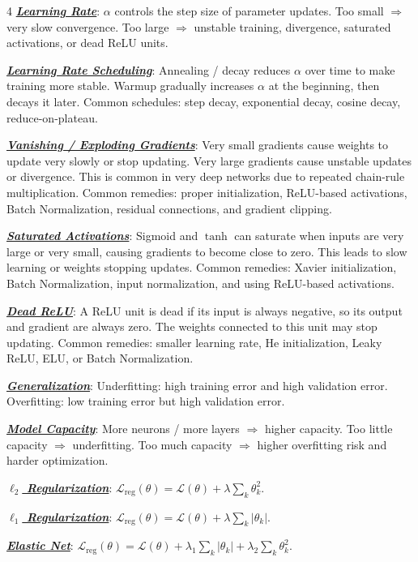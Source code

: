 \documentclass[12pt]{article}
\newcommand{\bulletPoint}[1]{\underline{\textit{\textbf{#1}}}}
\begin{document}
\begin{multicols*}{4}
\bulletPoint{Learning Rate}:
$\alpha$ controls the step size of parameter updates.
Too small $\Rightarrow$ very slow convergence.
Too large $\Rightarrow$ unstable training, divergence, saturated activations, or dead ReLU units.

\bulletPoint{Learning Rate Scheduling}:
Annealing / decay reduces $\alpha$ over time to make training more stable.
Warmup gradually increases $\alpha$ at the beginning, then decays it later.
Common schedules: step decay, exponential decay, cosine decay, reduce-on-plateau.

\bulletPoint{Vanishing / Exploding Gradients}:
Very small gradients cause weights to update very slowly or stop updating.
Very large gradients cause unstable updates or divergence.
This is common in very deep networks due to repeated chain-rule multiplication.
Common remedies: proper initialization, ReLU-based activations, Batch Normalization, residual connections, and gradient clipping.

\bulletPoint{Saturated Activations}:
Sigmoid and $\tanh$ can saturate when inputs are very large or very small, causing gradients to become close to zero.
This leads to slow learning or weights stopping updates.
Common remedies: Xavier initialization, Batch Normalization, input normalization, and using ReLU-based activations.

\bulletPoint{Dead ReLU}:
A ReLU unit is dead if its input is always negative, so its output and gradient are always zero.
The weights connected to this unit may stop updating.
Common remedies: smaller learning rate, He initialization, Leaky ReLU, ELU, or Batch Normalization.

\bulletPoint{Generalization}:
Underfitting: high training error and high validation error.
Overfitting: low training error but high validation error.

\bulletPoint{Model Capacity}:
More neurons / more layers $\Rightarrow$ higher capacity.
Too little capacity $\Rightarrow$ underfitting.
Too much capacity $\Rightarrow$ higher overfitting risk and harder optimization.

\bulletPoint{$\ell_2$ Regularization}:
\textcolor{purple!60!black}{$\textstyle
\mathcal L_{\mathrm{reg}}(\theta)
=
\mathcal L(\theta)+\lambda \sum_k \theta_k^2.
$}

\bulletPoint{$\ell_1$ Regularization}:
$\mathcal L_{\mathrm{reg}}(\theta)=\mathcal L(\theta)+\lambda \sum_k |\theta_k|.$

\bulletPoint{Elastic Net}:
$\mathcal L_{\mathrm{reg}}(\theta)
=
\mathcal L(\theta)+\lambda_1\sum_k |\theta_k|+\lambda_2\sum_k \theta_k^2.$


\end{multicols*}
\end{document}
